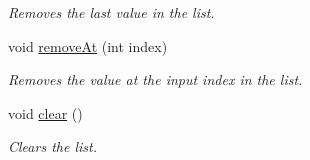 \begin{DoxyCompactItemize}
\begin{DoxyCompactList}\small\item\em Removes the last value in the list. \end{DoxyCompactList}\item 
\hypertarget{class_picto_1_1_analysis_variable_list_a912f929af257906cb921b61d2f2d7373}{void \hyperlink{class_picto_1_1_analysis_variable_list_a912f929af257906cb921b61d2f2d7373}{remove\-At} (int index)}\label{class_picto_1_1_analysis_variable_list_a912f929af257906cb921b61d2f2d7373}

\begin{DoxyCompactList}\small\item\em Removes the value at the input index in the list. \end{DoxyCompactList}\item 
\hypertarget{class_picto_1_1_analysis_variable_list_a4024ddec3df825f261c9825ef16c5cd5}{void \hyperlink{class_picto_1_1_analysis_variable_list_a4024ddec3df825f261c9825ef16c5cd5}{clear} ()}\label{class_picto_1_1_analysis_variable_list_a4024ddec3df825f261c9825ef16c5cd5}

\begin{DoxyCompactList}\small\item\em Clears the list. \end{DoxyCompactList}\end{DoxyCompactItemize}
